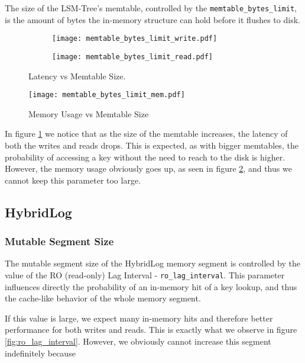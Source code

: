 The size of the LSM-Tree's memtable, controlled by the \verb"memtable_bytes_limit", is the amount of bytes the in-memory structure can hold before it flushes to disk.

\begin{figure}[h]
    \begin{subfigure}{.5\textwidth}
        \centering
        \texttt{[image: memtable\_bytes\_limit\_write.pdf]}
    \end{subfigure}
    \begin{subfigure}{.5\textwidth}
        \centering
        \texttt{[image: memtable\_bytes\_limit\_read.pdf]}
    \end{subfigure}
    \caption{Latency vs Memtable Size.}
    \label{fig:memtable-bytes-limit-write-read}
\end{figure}

\begin{figure}[h]
    \centering
    \texttt{[image: memtable\_bytes\_limit\_mem.pdf]}
    \caption{Memory Usage vs Memtable Size}
    \label{fig:memtable_bytes_limit_mem}
\end{figure}

In figure \ref{fig:memtable-bytes-limit-write-read} we notice that as the size of the memtable increases, the latency of both the writes and reads drops. This is expected, as with bigger memtables, the probability of accessing a key without the need to reach to the disk is higher. However, the memory usage obviously goes up, as seen in figure \ref{fig:memtable_bytes_limit_mem}, and thus we cannot keep this parameter too large.

\subsection{HybridLog}

\subsubsection{Mutable Segment Size}

The mutable segment size of the HybridLog memory segment is controlled by the value of the RO (read-only) Lag Interval - \verb"ro_lag_interval". This parameter influences directly the probability of an in-memory hit of a key lookup, and thus the cache-like behavior of the whole memory segment.

If this value is large, we expect many in-memory hits and therefore better performance for both writes and reads. This is exactly what we observe in figure \ref{fig:ro_lag_interval}. However, we obviously cannot increase this segment indefinitely because 

